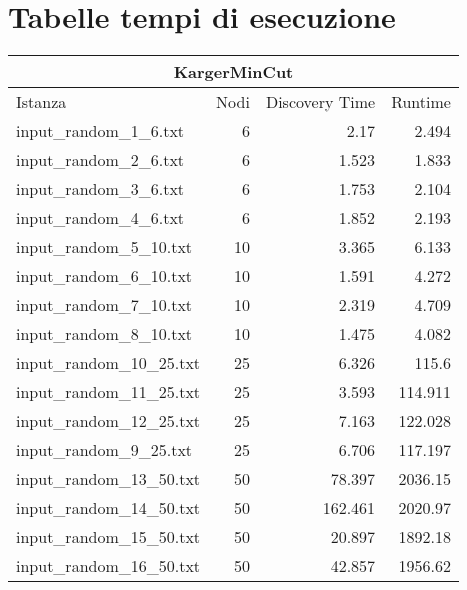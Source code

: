 \appendix
\section{Tabelle tempi di esecuzione}
\label{cap:runtime-tables}

\begin{table}[H]
    \centering

    \begin{tabular}{lrrr}
     \hline
     \multicolumn{4}{c}{KargerMinCut} \\
     \hline
     Istanza                    &   Nodi &   Discovery Time  &        Runtime \\
     \hline
     input\_random\_1\_6.txt    &       6 &            2.17  &          2.494 \\
     input\_random\_2\_6.txt    &       6 &            1.523 &          1.833 \\
     input\_random\_3\_6.txt    &       6 &            1.753 &          2.104 \\
     input\_random\_4\_6.txt    &       6 &            1.852 &          2.193 \\
     input\_random\_5\_10.txt   &      10 &            3.365 &          6.133 \\
     input\_random\_6\_10.txt   &      10 &            1.591 &          4.272 \\
     input\_random\_7\_10.txt   &      10 &            2.319 &          4.709 \\
     input\_random\_8\_10.txt   &      10 &            1.475 &          4.082 \\
     input\_random\_10\_25.txt  &      25 &            6.326 &        115.6   \\
     input\_random\_11\_25.txt  &      25 &            3.593 &        114.911 \\
     input\_random\_12\_25.txt  &      25 &            7.163 &        122.028 \\
     input\_random\_9\_25.txt   &      25 &            6.706 &        117.197 \\
     input\_random\_13\_50.txt  &      50 &           78.397 &       2036.15  \\
     input\_random\_14\_50.txt  &      50 &          162.461 &       2020.97  \\
     input\_random\_15\_50.txt  &      50 &           20.897 &       1892.18  \\
     input\_random\_16\_50.txt  &      50 &           42.857 &       1956.62  \\

\end{tabular}
\end{table}
